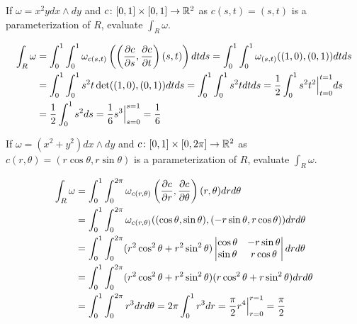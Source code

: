 \documentclass[notes.tex]{subfiles}
\begin{document}
\begin{exercise}
    If $\omega = x^2 y dx \wedge dy$ and $c\colon [0, 1] \times [0, 1] \to \mathbb{R}^2$ as $c(s, t) = (s, t)$ is a parameterization of $R$, evaluate $\int_R \omega$.
\end{exercise}
\begin{solution}
    \begin{align*}
        \int_R \omega
        &= \int_0^1 \int_0^1 \omega_{c(s, t)}\left( \left(\frac{\partial c}{\partial s}, \frac{\partial c}{\partial t}\right)(s, t) \right)dtds
        = \int_0^1 \int_0^1 \omega_{(s, t)}((1, 0), (0, 1))dtds \\
        &= \int_0^1 \int_0^1 s^2 t \operatorname{det}((1, 0), (0, 1)) dtds
        = \int_0^1 \int_0^1 s^2 t dtds
        = \frac{1}{2} \int_0^1 s^2 t^2\Big|_{t = 0}^{t = 1} ds \\
        &= \frac{1}{2} \int_0^1 s^2 ds
        = \frac{1}{6} s^3\Big|_{s = 0}^{s = 1}
        = \frac{1}{6}
    \end{align*}
\end{solution}

\begin{exercise}
    If $\omega = (x^2 + y^2)dx\wedge dy$ and $c\colon [0, 1] \times [0, 2\pi] \to \mathbb{R}^2$ as $c(r, \theta) = (r\cos \theta, r\sin \theta)$ is a parameterization of $R$, evaluate $\int_R \omega$.
\end{exercise}
\begin{solution}
    {\allowdisplaybreaks
    \begin{align*}
        \int_R \omega
        &= \int_0^1 \int_0^{2\pi} \omega_{c(r, \theta)}\left( \frac{\partial c}{\partial r}, \frac{\partial c}{\partial \theta} \right)(r, \theta) drd\theta \\
        &= \int_0^1 \int_0^{2\pi} \omega_{c(r, \theta)}( (\cos\theta, \sin\theta), (-r\sin\theta, r\cos\theta) )drd\theta \\
        &= \int_0^1 \int_0^{2\pi} (r^2\cos^2\theta + r^2\sin^2\theta)\begin{vmatrix}
            \cos \theta & -r\sin\theta \\
            \sin \theta & r\cos\theta
        \end{vmatrix}drd\theta \\
        &= \int_0^1 \int_0^{2\pi} (r^2\cos^2\theta + r^2\sin^2\theta)(r\cos^2\theta + r\sin^2\theta)drd\theta \\
        &= \int_0^1 \int_0^{2\pi} r^3 drd\theta
        = 2\pi\int_0^1 r^3 dr
        = \frac{\pi}{2} r^4\Big|_{r = 0}^{r = 1}
        = \frac{\pi}{2}
    \end{align*}
    }
\end{solution}
\end{document}
